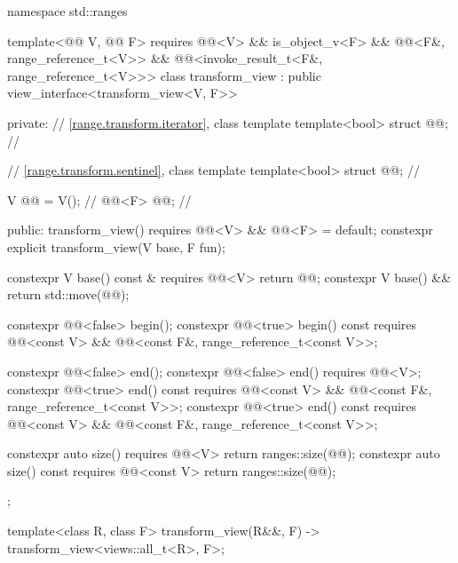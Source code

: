 %
%
%
\begin{codeblock}
namespace std::ranges {
  template<@@ V, @@ F>
    requires @@<V> && is_object_v<F> &&
             @@<F&, range_reference_t<V>> &&
             @@<invoke_result_t<F&, range_reference_t<V>>>
  class transform_view : public view_interface<transform_view<V, F>> {
  private:
    // \ref{range.transform.iterator}, class template 
    template<bool> struct @@;             // \expos

    // \ref{range.transform.sentinel}, class template 
    template<bool> struct @@;             // \expos

    V @@ = V();                              // \expos
    @@<F> @@;                        // \expos

  public:
    transform_view() requires @@<V> && @@<F> = default;
    constexpr explicit transform_view(V base, F fun);

    constexpr V base() const & requires @@<V> { return @@; }
    constexpr V base() && { return std::move(@@); }

    constexpr @@<false> begin();
    constexpr @@<true> begin() const
      requires @@<const V> &&
               @@<const F&, range_reference_t<const V>>;

    constexpr @@<false> end();
    constexpr @@<false> end() requires @@<V>;
    constexpr @@<true> end() const
      requires @@<const V> &&
               @@<const F&, range_reference_t<const V>>;
    constexpr @@<true> end() const
      requires @@<const V> &&
               @@<const F&, range_reference_t<const V>>;

    constexpr auto size() requires @@<V> { return ranges::size(@@); }
    constexpr auto size() const requires @@<const V>
    { return ranges::size(@@); }
  };

  template<class R, class F>
    transform_view(R&&, F) -> transform_view<views::all_t<R>, F>;
}
\end{codeblock}

